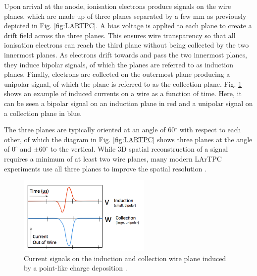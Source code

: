 Upon arrival at the anode, ionisation electrons produce signals on the wire planes, which are made up of three planes separated by a few mm as previously depicted in Fig. \ref{fig:LARTPC}.
A bias voltage is applied to each plane to create a drift field across the three planes.
This ensures wire transparency so that all ionisation electrons can reach the third plane without being collected by the two innermost planes.
As electrons drift towards and pass the two innermost planes, they induce bipolar signals, of which the planes are referred to as induction planes.
Finally, electrons are collected on the outermost plane producing a unipolar signal, of which the plane is referred to as the collection plane.
Fig. \ref{fig:wire_current} shows an example of induced currents on a wire as a function of time.
Here, it can be seen a bipolar signal on an induction plane in red and a unipolar signal on a collection plane in blue.

The three planes are typically oriented at an angle of 60$^{\circ}$ with respect to each other, of which the diagram in Fig. \ref{fig:LARTPC} shows three planes at the angle of $0^{\circ}$ and $\pm60^{\circ}$ to the vertical.
While 3D spatial reconstruction of a signal requires a minimum of at least two wire planes, many modern LArTPC experiments use all three planes to improve the spatial resolution \cite{argoneut, icarus_det, ubooneDet, sbnd_det, protodune, dunefd_det}.

\begin{figure}[ht] 
\centering    
\includegraphics[width=0.57\textwidth]{wire_current}
\caption[Induced Currents on an Induction and a Collection Wire Plane]{
Current signals on the induction and collection wire plane induced by a point-like charge deposition \cite{argoneut}.
\hfill
\break
}
\label{fig:wire_current}
\end{figure}


